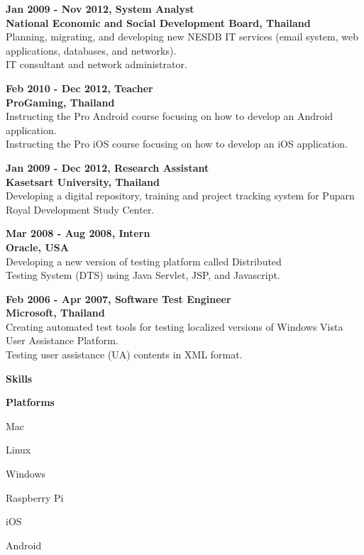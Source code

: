 \documentclass[a4paper,12pt,final]{memoir}
\newcommand{\Sep}{\vspace{1.5em}}
\newcommand{\SmallSep}{\vspace{0.5em}}
\newcommand{\CVSection}[1]
	{\Large\textbf{#1}\par
	\SmallSep\normalsize\normalfont}
\newcommand{\CVItem}[1]
	{\textbf{\color{RoyalBlue} #1}}
\begin{document}
\clearpage
\framebreak
\framebreak

\CVItem{Jan 2009 - Nov 2012, System Analyst}\\
\textbf{National Economic and Social Development Board, Thailand}\\
Planning, migrating, and developing new NESDB IT services (email system, web applications, databases, and networks).\\
IT consultant and network administrator.

\SmallSep

\CVItem{Feb 2010 - Dec 2012, Teacher}\\
\textbf{ProGaming, Thailand}\\
Instructing the Pro Android course focusing on how to develop an Android application.\\
Instructing the Pro iOS course focusing on how to develop an iOS application.

\SmallSep

\CVItem{Jan 2009 - Dec 2012, Research Assistant}\\
\textbf{Kasetsart University, Thailand}\\
Developing a digital repository, training and project tracking system for Puparn Royal Development Study Center.
\SmallSep

\CVItem{Mar 2008 - Aug 2008, Intern}\\
\textbf{Oracle, USA}\\
Developing a new version of testing platform called Distributed\\ 
Testing System (DTS) using Java Servlet, JSP, and Javascript.

\SmallSep

\CVItem{Feb 2006 - Apr 2007, Software Test Engineer}\\
\textbf{Microsoft, Thailand}\\
Creating automated test tools for testing localized versions of Windows Vista User Assistance Platform.\\
Testing user assistance (UA) contents in XML format.

\SmallSep
\Sep

\CVSection{Skills}
\CVItem{Platforms}
\begin{multicols}{2}
\begin{compactitem}[\color{RoyalBlue}$\circ$]
	\item Mac
    \item Linux
    \item Windows
    \item Raspberry Pi
    \item iOS
    \item Android
\end{compactitem}
\end{multicols}
\SmallSep
\end{document}
